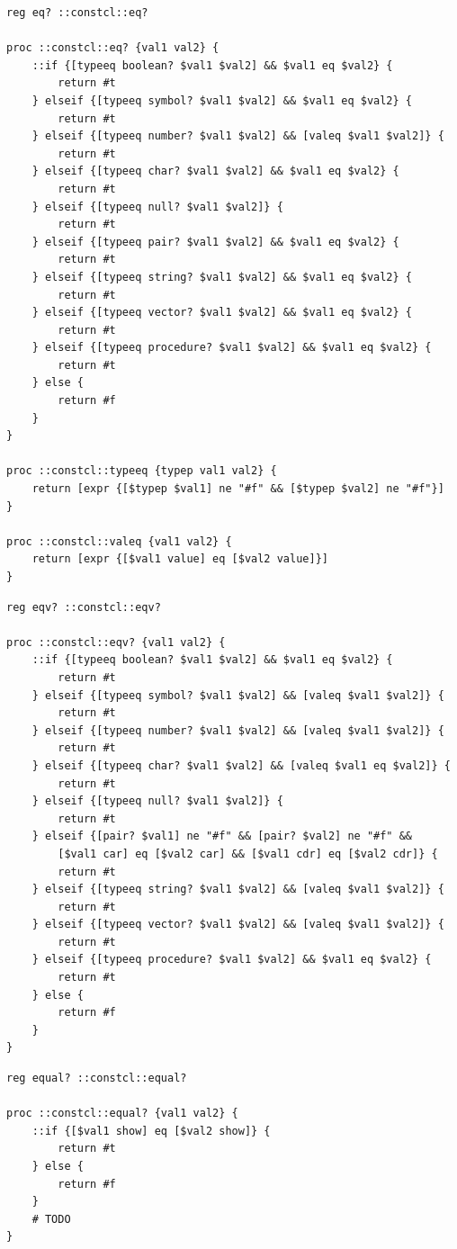 \documentclass[twoside,9pt]{report}
\begin{document}
\noindent\makebox[\linewidth]{\rule{\linewidth}{0.4pt}}
\begin{lstlisting}
reg eq? ::constcl::eq?
 
proc ::constcl::eq? {val1 val2} {
    ::if {[typeeq boolean? $val1 $val2] && $val1 eq $val2} {
        return #t
    } elseif {[typeeq symbol? $val1 $val2] && $val1 eq $val2} {
        return #t
    } elseif {[typeeq number? $val1 $val2] && [valeq $val1 $val2]} {
        return #t
    } elseif {[typeeq char? $val1 $val2] && $val1 eq $val2} {
        return #t
    } elseif {[typeeq null? $val1 $val2]} {
        return #t
    } elseif {[typeeq pair? $val1 $val2] && $val1 eq $val2} {
        return #t
    } elseif {[typeeq string? $val1 $val2] && $val1 eq $val2} {
        return #t
    } elseif {[typeeq vector? $val1 $val2] && $val1 eq $val2} {
        return #t
    } elseif {[typeeq procedure? $val1 $val2] && $val1 eq $val2} {
        return #t
    } else {
        return #f
    }
}
 
proc ::constcl::typeeq {typep val1 val2} {
    return [expr {[$typep $val1] ne "#f" && [$typep $val2] ne "#f"}]
}
 
proc ::constcl::valeq {val1 val2} {
    return [expr {[$val1 value] eq [$val2 value]}]
}
\end{lstlisting}
\noindent\makebox[\linewidth]{\rule{\linewidth}{0.4pt}}
\noindent\makebox[\linewidth]{\rule{\linewidth}{0.4pt}}
\begin{lstlisting}
reg eqv? ::constcl::eqv?
 
proc ::constcl::eqv? {val1 val2} {
    ::if {[typeeq boolean? $val1 $val2] && $val1 eq $val2} {
        return #t
    } elseif {[typeeq symbol? $val1 $val2] && [valeq $val1 $val2]} {
        return #t
    } elseif {[typeeq number? $val1 $val2] && [valeq $val1 $val2]} {
        return #t
    } elseif {[typeeq char? $val1 $val2] && [valeq $val1 eq $val2]} {
        return #t
    } elseif {[typeeq null? $val1 $val2]} {
        return #t
    } elseif {[pair? $val1] ne "#f" && [pair? $val2] ne "#f" &&
        [$val1 car] eq [$val2 car] && [$val1 cdr] eq [$val2 cdr]} {
        return #t
    } elseif {[typeeq string? $val1 $val2] && [valeq $val1 $val2]} {
        return #t
    } elseif {[typeeq vector? $val1 $val2] && [valeq $val1 $val2]} {
        return #t
    } elseif {[typeeq procedure? $val1 $val2] && $val1 eq $val2} {
        return #t
    } else {
        return #f
    }
}
\end{lstlisting}
\noindent\makebox[\linewidth]{\rule{\linewidth}{0.4pt}}
\noindent\makebox[\linewidth]{\rule{\linewidth}{0.4pt}}
\begin{lstlisting}
reg equal? ::constcl::equal?
 
proc ::constcl::equal? {val1 val2} {
    ::if {[$val1 show] eq [$val2 show]} {
        return #t
    } else {
        return #f
    }
    # TODO
}
\end{lstlisting}
\noindent\makebox[\linewidth]{\rule{\linewidth}{0.4pt}}
\end{document}

